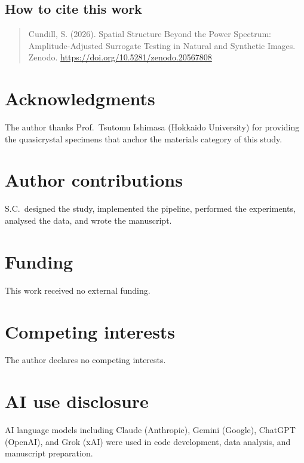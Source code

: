 \documentclass[a4paper,12pt]{article}
\begin{document}
\subsection*{How to cite this work}

\begin{quote}
Cundill, S. (2026). Spatial Structure Beyond the Power Spectrum:
Amplitude-Adjusted Surrogate Testing in Natural and Synthetic Images. Zenodo.
\url{https://doi.org/10.5281/zenodo.20567808}
\end{quote}

\section*{Acknowledgments}
The author thanks Prof.\ Tsutomu Ishimasa (Hokkaido University) for providing the quasicrystal specimens that anchor the materials category of this study.

\section*{Author contributions}
S.C.\ designed the study, implemented the pipeline, performed the experiments, analysed the data, and wrote the manuscript.

\section*{Funding}
This work received no external funding.

\section*{Competing interests}
The author declares no competing interests.

\section*{AI use disclosure}
AI language models including Claude (Anthropic), Gemini (Google), ChatGPT (OpenAI), and Grok (xAI) were used in code development, data analysis, and manuscript preparation.


\end{document}
